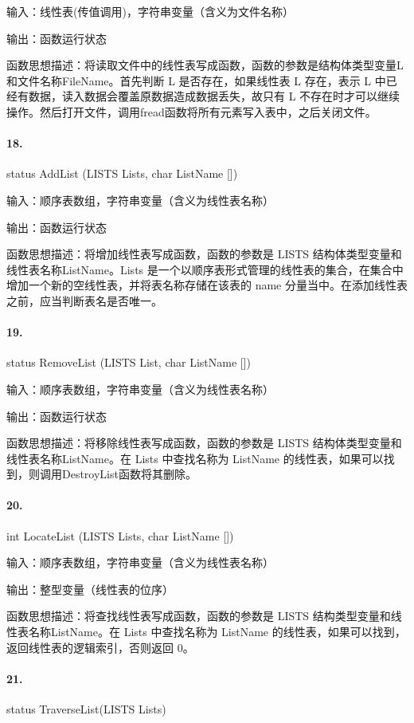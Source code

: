 \documentclass[supercite]{Experimental_Report}
\theoremstyle{definition}
\begin{document}
输入：线性表(传值调用)，字符串变量（含义为文件名称）

输出：函数运行状态

函数思想描述：将读取文件中的线性表写成函数，函数的参数是结构体类型变量L和文件名称FileName。首先判断 L 是否存在，如果线性表 L 存在，表示 L 中已经有数据，读入数据会覆盖原数据造成数据丢失，故只有 L 不存在时才可以继续操作。然后打开文件，调用fread函数将所有元素写入表中，之后关闭文件。

\paragraph{18.}status AddList (LISTS Lists, char ListName [])

输入：顺序表数组，字符串变量（含义为线性表名称）

输出：函数运行状态

函数思想描述：将增加线性表写成函数，函数的参数是 LISTS 结构体类型变量和线性表名称ListName。Lists 是一个以顺序表形式管理的线性表的集合，在集合中增加一个新的空线性表，并将表名称存储在该表的 name 分量当中。在添加线性表之前，应当判断表名是否唯一。

\paragraph{19.}status RemoveList (LISTS List, char ListName [])

输入：顺序表数组，字符串变量（含义为线性表名称）

输出：函数运行状态

函数思想描述：将移除线性表写成函数，函数的参数是 LISTS 结构体类型变量和线性表名称ListName。在 Lists 中查找名称为 ListName 的线性表，如果可以找到，则调用DestroyList函数将其删除。

\paragraph{20.}int LocateList (LISTS Lists, char ListName [])

输入：顺序表数组，字符串变量（含义为线性表名称）

输出：整型变量（线性表的位序）

函数思想描述：将查找线性表写成函数，函数的参数是 LISTS 结构类型变量和线性表名称ListName。在 Lists 中查找名称为 ListName 的线性表，如果可以找到，返回线性表的逻辑索引，否则返回 0。

\paragraph{21.}status TraverseList(LISTS Lists)
\end{document}
